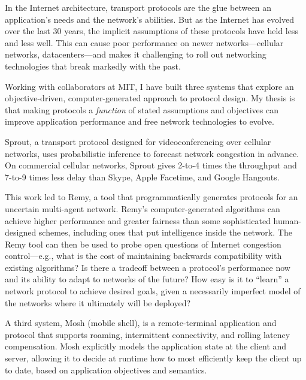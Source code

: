 % 
% 
%
In the Internet architecture, transport protocols are the glue between
an application's needs and the network's abilities. But as the
Internet has evolved over the last 30 years, the implicit assumptions
of these protocols have held less and less well. This can cause poor
performance on newer networks---cellular networks, datacenters---and
makes it challenging to roll out networking technologies that break
markedly with the past.

Working with collaborators at MIT, I have built three systems that
explore an objective-driven, computer-generated approach to protocol
design. My thesis is that making protocols a \emph{function} of stated
assumptions and objectives can improve application performance and
free network technologies to evolve.

Sprout, a transport protocol designed for videoconferencing over
cellular networks, uses probabilistic inference to forecast network
congestion in advance. On commercial cellular networks, Sprout gives
2-to-4 times the throughput and 7-to-9 times less delay than Skype,
Apple Facetime, and Google Hangouts.

This work led to Remy, a tool that programmatically generates
protocols for an uncertain multi-agent network. Remy's
computer-generated algorithms can achieve higher performance and
greater fairness than some sophisticated human-designed schemes,
including ones that put intelligence inside the network. The Remy tool
can then be used to probe open questions of Internet congestion
control---e.g., what is the cost of maintaining backwards
compatibility with existing algorithms? Is there a tradeoff between a
protocol's performance now and its ability to adapt to networks of the
future? How easy is it to ``learn'' a network protocol to achieve
desired goals, given a necessarily imperfect model of the networks
where it ultimately will be deployed?

A third system, Mosh (mobile shell), is a remote-terminal application
and protocol that supports roaming, intermittent connectivity, and
rolling latency compensation. Mosh explicitly models the application
state at the client and server, allowing it to decide at runtime how
to most efficiently keep the client up to date, based on application
objectives and semantics.
